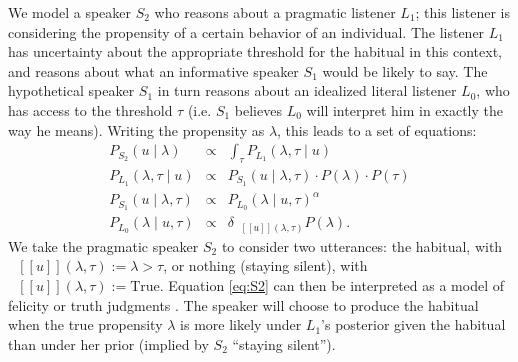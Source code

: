 \documentclass[10pt,letterpaper]{article}
\newcommand{\denote}[1]{\mbox{ $[\![ #1 ]\!]$}}
\newcommand{\ndg}[1]{\textcolor{Green}{[ndg: #1]}}
\begin{document}
We model a speaker $S_2$ who reasons about a pragmatic listener $L_1$; this listener is considering the propensity of a certain behavior of an individual.
The listener $L_1$ has uncertainty about the appropriate threshold for the habitual in this context, and reasons about what an informative speaker $S_1$ would be likely to say. The hypothetical speaker $S_1$ in turn reasons about an idealized literal listener $L_0$, who has access to the threshold $\tau$ (i.e. $S_1$ believes $L_0$ will interpret him in exactly the way he means). 
%
Writing the propensity as $\lambda$, this leads to a set of equations:
\begin{eqnarray}
P_{S_{2}}(u \mid \lambda) & \propto &  \int_{\tau} P_{L_{1}}(\lambda , \tau \mid u) \label{eq:S2}\\
P_{L_{1}}(\lambda , \tau \mid u) &\propto& P_{S_{1}}(u \mid \lambda, \tau) \cdot P(\lambda) \cdot P(\tau) \label{eq:L1}\\
P_{S_{1}}(u \mid \lambda, \tau) &\propto&  {P_{L_{0}}(\lambda \mid u, \tau)}^{\alpha} \label{eq:S1}\\
P_{L_{0}}(\lambda \mid u, \tau) &\propto& {\delta_{\denote{u}(\lambda, \tau)} P(\lambda)}. \label{eq:L0}
\end{eqnarray}
We take the pragmatic speaker $S_2$ to consider two utterances: the habitual, with $\denote{u}(\lambda, \tau) := \lambda>\tau$, or nothing (staying silent), with $\denote{u}(\lambda, \tau) := \text{True}$.
Equation \ref{eq:S2} can then be interpreted as a model of felicity or truth judgments \cite{Degen2014, TesslerUnderReview}.
The speaker will choose to produce the habitual when the true propensity $\lambda$ is more likely under $L_1$'s posterior given the habitual than under her prior (implied by $S_2$ ``staying silent''). 
\end{document}
